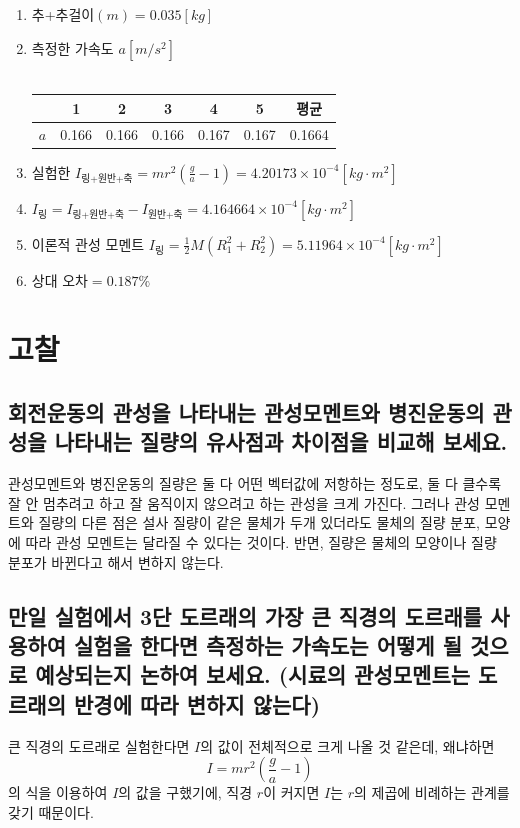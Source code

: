 \documentclass[12pt,a4paper]{article}
\begin{document}
\begin{enumerate}
\begin{enumerate}
\begin{tabular}{|c|c|c|c|c|c|c|}
                    \hline
                \end{tabular}
            \item 추+추걸이$(m)=0.035[kg]$
            \item 측정한 가속도 $a[m/s^2]$ \\
                \\
                \begin{tabular}{|c|c|c|c|c|c|c|}
                    \hline
                    &1&2&3&4&5&평균 \\
                    \hline
                    $a$&0.166&0.166&0.166&0.167&0.167&0.1664 \\
                    \hline
                \end{tabular}
            \item 실험한 $I_{\textrm{링+원반+축}}=
                mr^2(\frac{g}{a}-1)=4.20173\times10^{-4}[kg\cdot m^2]$
            \item $I_{\textrm{링}}=I_{\textrm{링+원반+축}}-I_{\textrm{원반+축}}=
                4.164664\times10^{-4}[kg\cdot m^2]$
            \item 이론적 관성 모멘트 $I_{\textrm{링}}=\frac{1}{2}M(R_1^2+R_2^2)=
                5.11964\times10^{-4}[kg\cdot m^2]$
            \item 상대 오차$=0.187\%$
        \end{enumerate}
\end{enumerate}
\clearpage
\section{고찰}
\subsection{회전운동의 관성을 나타내는 관성모멘트와 병진운동의 관성을 나타내는 질량의
    유사점과 차이점을 비교해 보세요.}
    관성모멘트와 병진운동의 질량은 둘 다 어떤 벡터값에 저항하는 정도로, 둘 다 클수록
    잘 안 멈추려고 하고 잘 움직이지 않으려고 하는 관성을 크게 가진다.
    그러나 관성 모멘트와 질량의 다른 점은 설사 질량이 같은 물체가 두개 있더라도
    물체의 질량 분포, 모양에 따라 관성 모멘트는 달라질 수 있다는 것이다.
    반면, 질량은 물체의 모양이나 질량 분포가 바뀐다고 해서 변하지 않는다.
\subsection{만일 실험에서 3단 도르래의 가장 큰 직경의 도르래를 사용하여 실험을
    한다면 측정하는 가속도는 어떻게 될 것으로 예상되는지 논하여 보세요.
    (시료의 관성모멘트는 도르래의 반경에 따라 변하지 않는다)}
    큰 직경의 도르래로 실험한다면 $I$의 값이 전체적으로 크게 나올 것 같은데, 왜냐하면
    $$I=mr^2(\frac{g}{a}-1)$$
    의 식을 이용하여 $I$의 값을 구했기에, 직경 $r$이 커지면 $I$는 $r$의 제곱에
    비례하는 관계를 갖기 때문이다.
\end{document}

